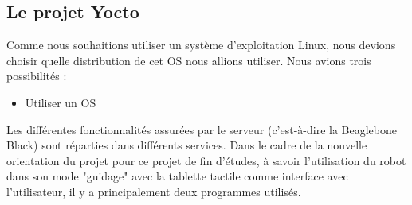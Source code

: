 \documentclass{report}
\begin{document}
    \subsection{Le projet Yocto}
    {Comme nous souhaitions utiliser un système d'exploitation Linux, nous devions
    choisir quelle distribution de cet OS nous allions utiliser. Nous avions trois
    possibilités :}
    \begin{itemize}
      \item Utiliser un OS
    \end{itemize}




    {Les différentes fonctionnalités assurées par le serveur (c'est-à-dire la
    Beaglebone Black) sont réparties dans différents services. Dans le cadre de la
    nouvelle orientation du projet pour ce projet de fin d'études, à savoir l'utilisation
    du robot dans son mode "guidage" avec la tablette tactile comme interface avec
    l'utilisateur, il y a principalement deux programmes utilisés.}
\end{document}
